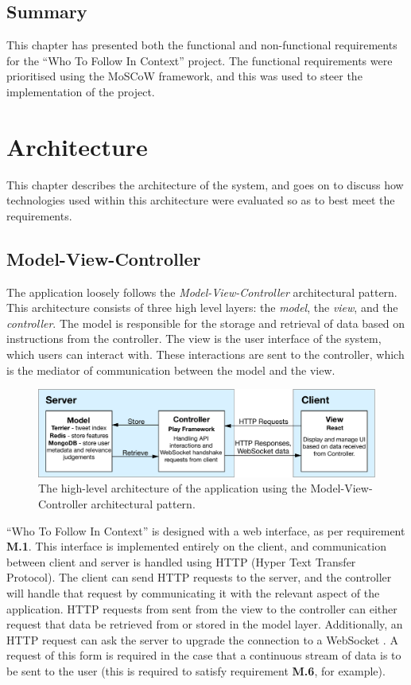\documentclass{l4proj}
\begin{document}
\section{Summary}
This chapter has presented both the functional and non-functional requirements for the ``Who To Follow In Context'' project. The functional requirements were prioritised using the MoSCoW framework, and this was used to steer the implementation of the project.

\chapter{Architecture}

This chapter describes the architecture of the system, and goes on to discuss how technologies used within this architecture were evaluated so as to best meet the requirements.
    
    \section{Model-View-Controller}
    The application loosely follows the \textit{Model-View-Controller} architectural pattern. This architecture consists of three high level layers: the \textit{model}, the \textit{view}, and the \textit{controller}. The model is responsible for the storage and retrieval of data based on instructions from the controller. The view is the user interface of the system, which users can interact with. These interactions are sent to the controller, which is the mediator of communication between the model and the view.
    
\begin{figure}[H]
\centering
\includegraphics[scale=0.70]{mvc.pdf}
\caption{The high-level architecture of the application using the Model-View-Controller architectural pattern.}
\label{mvc}
\end{figure}

``Who To Follow In Context'' is designed with a web interface, as per requirement \textbf{M.1}. This interface is implemented entirely on the client, and communication between client and server is handled using HTTP (Hyper Text Transfer Protocol). The client can send HTTP requests to the server, and the controller will handle that request by communicating it with the relevant aspect of the application. HTTP requests from sent from the view to the controller can either request that data be retrieved from or stored in the model layer. Additionally, an HTTP request can ask the server to upgrade the connection to a WebSocket \cite{websocket}. A request of this form is required in the case that a continuous stream of data is to be sent to the user (this is required to satisfy requirement \textbf{M.6}, for example).
    
\end{document}
